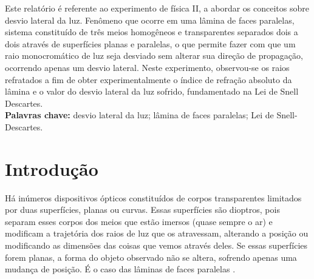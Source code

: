 \documentclass[
	12pt,				%
	oneside,			%
	a4paper,			%
	english,			%
	french,				%
	spanish,			%
	brazil				%
	]{abntex2}
\begin{document}
\imprimirfolhaderosto

\setlength{\absparsep}{18pt} %
\begin{resumo}
Este relatório é referente ao experimento de física II, a abordar os conceitos sobre desvio lateral da luz. Fenômeno que ocorre em uma lâmina de faces paralelas, sistema constituído de três meios homogêneos e transparentes separados dois a dois através de superfícies planas e paralelas, o que permite fazer com que um raio monocromático de luz seja desviado sem alterar sua direção de propagação, ocorrendo apenas um desvio lateral. Neste experimento, observou-se os raios refratados a fim de obter experimentalmente o índice de refração absoluto da lâmina e o valor do desvio lateral da luz sofrido, fundamentado na Lei de Snell Descartes.\\
\thispagestyle{plain}
\textbf{Palavras chave:}  desvio lateral da luz; lâmina de faces paralelas; Lei de Snell-Descartes.
\end{resumo}


\tableofcontents*
\cleardoublepage

\textual

\chapter{Introdução}

Há inúmeros dispositivos ópticos constituídos de corpos transparentes limitados por duas superfícies, planas ou curvas. Essas superfícies são dioptros, pois separam esses corpos dos meios que estão imersos (quase sempre o ar) e modificam a trajetória dos raios de luz que os atravessam, alterando a posição ou modificando as dimensões das coisas que vemos através deles. Se essas superfícies forem planas, a forma do objeto observado não se altera, sofrendo apenas uma mudança de posição. É o caso das lâminas de faces paralelas \cite{gaspar}.
\end{document}
